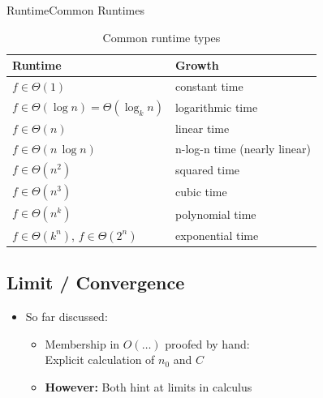 
\begin{frame}{Runtime}{Common Runtimes}
  \label{slide:theta-examples}
  \begin{table}[!h]
    \begin{center}
      \caption{Common runtime types}
      \label{RuntimeTable}
      \begin{tabularx}{\textwidth}{XX}
        Runtime & Growth\\
        \hline
        $f \in \Theta (1)$ & constant time\\
        $f \in \Theta (\log n) = \Theta (\log_k n)$ & logarithmic time\\
        $f \in \Theta (n)$ & linear time\\
        $f \in \Theta (n \, \log n)$ & n-log-n time (nearly linear)\\
        \hline
        $f \in \Theta (n^2)$ & squared time\\
        $f \in \Theta (n^3)$ & cubic time\\
        $f \in \Theta (n^k)$ & polynomial time\\
        \hline
        $f \in \Theta (k^n)$, $f \in \Theta(2^n)$ & exponential time
      \end{tabularx}
    \end{center}
  \end{table}
\end{frame}


\subsection{Limit / Convergence}

\begin{frame}
  \begin{itemize}
  \item So far discussed:
    \begin{itemize}
      \item Membership in $O(\ldots)$ proofed by hand:\\
        {\color{MainA}Explicit calculation of $n_0$ and $C$}
	  \vspace{1em}
      \item
	    \textbf{However:} Both hint at {\color{MainA}limits} in calculus
    \end{itemize}
  \end{itemize}
\end{frame}

